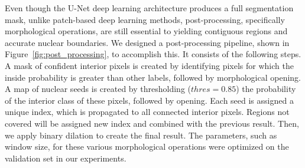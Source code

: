 Even though the U-Net deep learning architecture produces a full segmentation mask, unlike patch-based deep learning methods, post-processing, specifically morphological operations, are still essential to yielding contiguous regions and accurate nuclear boundaries.
We designed a post-processing pipeline, shown in Figure~\ref{fig:post_processing}, to accomplish this.
It consists of the following steps.
A mask of confident interior pixels is created by identifying pixels for which the inside probability is greater than other labels, followed by morphological opening.
A map of nuclear seeds is created by thresholding ($thres = 0.85$) the probability of the interior class of these pixels, followed by opening.
Each seed is assigned a unique index, which is propagated to all connected interior pixels.
Regions not covered will be assigned new index and combined with the previous result.
Then, we apply binary dilation to create the final result.
The parameters, such as window size, for these various morphological operations were optimized on the validation set in our experiments.

%

